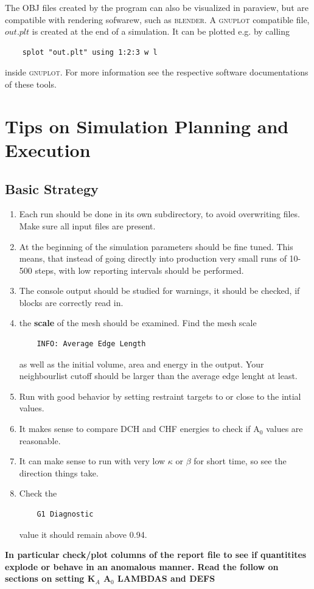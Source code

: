\documentclass[11pt]{article}
\begin{document}
The \textsc{OBJ} files created by the program can also be visualized in paraview, but are compatible with rendering sofwarew, such as \textsc{blender}. A \textsc{gnuplot} compatible file, $out.plt$ is created at the end of a simulation. It can be plotted e.g. by calling

\begin{verbatim}
    splot "out.plt" using 1:2:3 w l
\end{verbatim}
inside \textsc{gnuplot}. For more information see the respective software documentations of these tools.



\section{Tips on Simulation Planning and Execution}

\subsection{Basic Strategy}
\begin{enumerate}
    \item Each run should be done in its own subdirectory, to avoid overwriting files. Make sure all input files are present.
\item At the beginning of the simulation parameters should be fine tuned. This means, that instead of going directly into production very small runs of 10-500 steps, with low reporting intervals should be performed.
\item The console output should be studied for warnings, it should be checked, if blocks are correctly read in. 
\item the \textbf{scale} of the mesh should be examined. Find the mesh scale
\begin{verbatim}
    INFO: Average Edge Length
\end{verbatim}
as well as the initial volume, area and energy in the output. Your neighbourlist cutoff should be larger than the average edge lenght at least. 
\item Run with good behavior by setting restraint targets to or close to the intial values.
\item It makes sense to compare DCH and CHF energies to check if A$_0$ values are reasonable.
\item It can make sense to run with very low $\kappa$ or $\beta$ for short time, so see the direction things take.
\item Check the 
\begin{verbatim}
    G1 Diagnostic
\end{verbatim}
value it should remain above 0.94.
\end{enumerate}
\noindent
\textbf{In particular check/plot columns of the report file to see if quantitites explode or behave in an anomalous manner. Read the follow on sections on setting K$_A$ A$_0$ LAMBDAS and DEFS}
\end{document}
